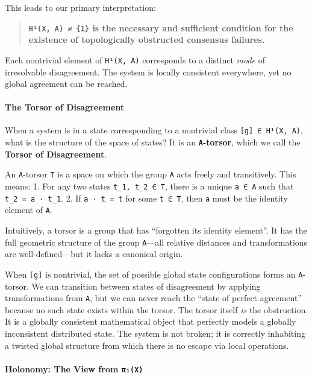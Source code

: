 \documentclass[
]{article}
\begin{document}
This leads to our primary interpretation:

\begin{quote}
\textbf{\texttt{H¹(X,\ A)\ ≠\ \{1\}} is the necessary and sufficient
condition for the existence of topologically obstructed consensus
failures.}
\end{quote}

Each nontrivial element of \texttt{H¹(X,\ A)} corresponds to a distinct
\emph{mode} of irresolvable disagreement. The system is locally
consistent everywhere, yet no global agreement can be reached.

\paragraph{The Torsor of Disagreement}\label{the-torsor-of-disagreement}

When a system is in a state corresponding to a nontrivial class
\texttt{{[}g{]}\ ∈\ H¹(X,\ A)}, what is the structure of the space of
states? It is an \textbf{\texttt{A}-torsor}, which we call the
\textbf{Torsor of Disagreement}.

An \texttt{A}-torsor \texttt{T} is a space on which the group \texttt{A}
acts freely and transitively. This means: 1. For any two states
\texttt{t\_1,\ t\_2\ ∈\ T}, there is a unique \texttt{a\ ∈\ A} such that
\texttt{t\_2\ =\ a\ ·\ t\_1}. 2. If \texttt{a\ ·\ t\ =\ t} for some
\texttt{t\ ∈\ T}, then \texttt{a} must be the identity element of
\texttt{A}.

Intuitively, a torsor is a group that has ``forgotten its identity
element''. It has the full geometric structure of the group
\texttt{A}---all relative distances and transformations are
well-defined---but it lacks a canonical origin.

When \texttt{{[}g{]}} is nontrivial, the set of possible global state
configurations forms an \texttt{A}-torsor. We can transition between
states of disagreement by applying transformations from \texttt{A}, but
we can never reach the ``state of perfect agreement'' because no such
state exists within the torsor. The torsor itself \emph{is} the
obstruction. It is a globally consistent mathematical object that
perfectly models a globally inconsistent distributed state. The system
is not broken; it is correctly inhabiting a twisted global structure
from which there is no escape via local operations.

\paragraph{\texorpdfstring{Holonomy: The View from
\texttt{π₁(X)}}{Holonomy: The View from π₁(X)}}\label{holonomy-the-view-from-ux3c0ux2081x}
\end{document}
